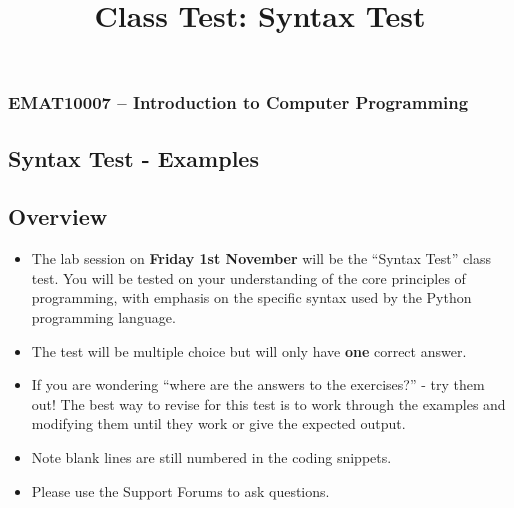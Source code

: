 \documentclass[11pt]{report}
\begin{document}
\title{Class Test: Syntax Test}
\subsubsection*{EMAT10007 -- Introduction to Computer Programming}
\subsection*{\Large Syntax Test - Examples}

\subsection*{Overview}
\begin{itemize}
    \item The lab session on \textbf{Friday 1st November} will be the ``Syntax Test'' class test. You will be tested on your understanding of the core principles of programming, with emphasis on the specific syntax used by the Python programming language.

	\item The test will be multiple choice but will only have \textbf{one} correct answer.

    \item If you are wondering ``where are the answers to the exercises?'' - try them out! The best way to revise for this test is to work through the examples and modifying them until they work or give the expected output.
    
    \item Note blank lines are still numbered in the coding snippets.

    \item Please use the Support Forums to ask questions.
\end{itemize}
\end{document}
